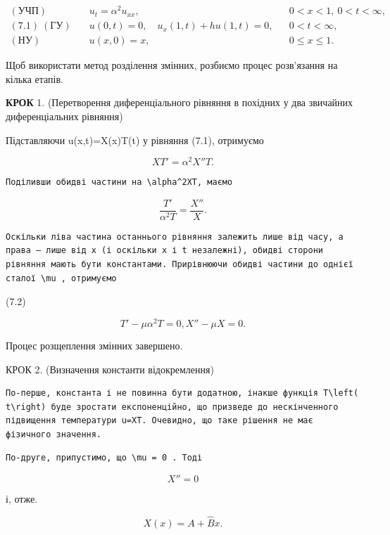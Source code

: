 \documentclass[
  ukrainian,
]{article}
\begin{document}
\[
\begin{aligned}
(\text{УЧП})\quad & u_t = \alpha^2 u_{xx}, && 0 < x < 1,\ 0 < t < \infty, \\
(7.1)\ (\text{ГУ})\quad & u(0,t) = 0,\quad u_x(1,t) + h u(1,t) = 0, && 0 < t < \infty, \\
(\text{НУ})\quad & u(x,0) = x, && 0 \leq x \leq 1.
\end{aligned}
\]

Щоб використати метод розділення змінних, розбиємо процес розв'язання на
кілька етапів.

\textbf{КРОК} 1. (Перетворення диференціального рівняння в похідних у
два звичайних диференціальних рівняння)

Підставляючи u(x,t)=X(x)T(t) у рівняння (7.1), отримуємо

\[
XT'=\alpha^2X''T.
\]

\begin{verbatim}
Поділивши обидві частини на \alpha^2XT, маємо
\end{verbatim}

\[
\frac{T'}{\alpha^2 T} = \frac{X''}{X} .
\]

\begin{verbatim}
Оскільки ліва частина останнього рівняння залежить лише від часу, а права — лише від x (і оскільки x і t незалежні), обидві сторони рівняння мають бути константами. Прирівнюючи обидві частини до однієї сталої \mu , отримуємо
\end{verbatim}

(7.2)

\[
T' - \mu \alpha^{2} T = 0, X'' - \mu X = 0.
\]

Процес розщеплення змінних завершено.

КРОК 2. (Визначення константи відокремлення)

\begin{verbatim}
По-перше, константа і не повинна бути додатною, інакше функція T\left( t\right) буде зростати експоненційно, що призведе до нескінченного підвищення температури u=XT. Очевидно, що таке рішення не має фізичного значення.
\end{verbatim}

\begin{verbatim}
По-друге, припустимо, що \mu = 0 . Тоді
\end{verbatim}

\[
X'' = 0
\]

і, отже.

\[
X(x) = A + \hat{B}x.
\]
\end{document}

